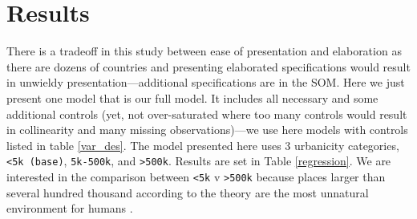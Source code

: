 \documentclass[10pt, letterpaper]{article}
\begin{document}







\section*{Results}

%
There is a tradeoff in this study between ease of presentation and
elaboration as there are dozens of countries and presenting elaborated
specifications would result in unwieldy presentation---additional specifications
are in the SOM. Here we just present one model that is our full model. It
includes all necessary and some additional controls (yet, not over-saturated
where too many controls would result in collinearity and  many missing observations)---we use here models with controls listed in table
\ref{var_des}. 
 The model presented here uses 3 urbanicity categories, \texttt{<5k (base)}, \texttt{5k-500k},
 and \texttt{>500k}. Results are set in Table \ref{regression}. We are interested in
 the comparison between \texttt{<5k} v \texttt{>500k} because places larger than several
 hundred thousand according to the theory are the most unnatural environment for humans %
.
\end{document}
